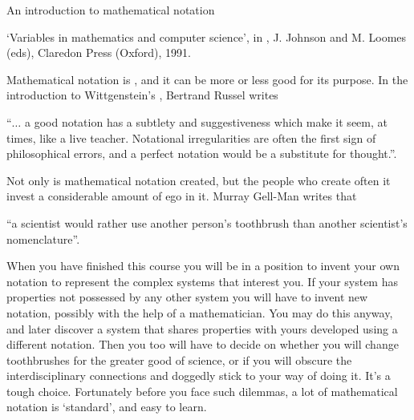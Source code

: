 \documentclass[a4paper]{cnx}
\begin{document}
\begin{cnxmodule}[id=m0001,name=Session 1: Set theory in the science of complex systems.]
\begin{ccontent}
\begin{csection}[id=intro-math-notation]{An introduction to mathematical notation}
\begin{cpara}
{      `Variables in mathematics and computer science', in {}, J. Johnson and M. Loomes (eds), Claredon
      Press (Oxford), 1991.}
  \end{cpara}
  \begin{cpara}
    Mathematical notation is {}, and it can be more or less good for its
    purpose. In the introduction to Wittgenstein's {}, Bertrand Russel writes
    \begin{cquote}
      ``$\dots$ a good notation has a subtlety and suggestiveness which make it seem, at
      times, like a live teacher. Notational irregularities are often the first sign of
      philosophical errors, and a perfect notation would be a substitute for thought.''.
    \end{cquote}
    Not only is mathematical notation created, but the people who create often it invest a
    considerable amount of ego in it. Murray Gell-Man writes that
    \begin{cquote}
      ``a scientist would rather use another person's toothbrush than another scientist's
      nomenclature''.
    \end{cquote}
  \end{cpara}
  \begin{cpara}
    When you have finished this course you will be in a position to invent your own
    notation to represent the complex systems that interest you. If your system has
    properties not possessed by any other system you will have to invent new notation,
    possibly with the help of a mathematician. You may do this anyway, and later discover
    a system that shares properties with yours developed using a different notation. Then
    you too will have to decide on whether you will change toothbrushes for the greater
    good of science, or if you will obscure the interdisciplinary connections and doggedly
    stick to your way of doing it. It's a tough choice. Fortunately before you face such
    dilemmas, a lot of mathematical notation is `standard', and easy to learn.\medskip
  \end{cpara}
  \begin{cexercise}[id=saq2,name=SAQ]
    \begin{cproblem}[id=saq2p]

\end{cproblem}
\end{cexercise}
\end{csection}
\end{ccontent}
\end{cnxmodule}
\end{document}
